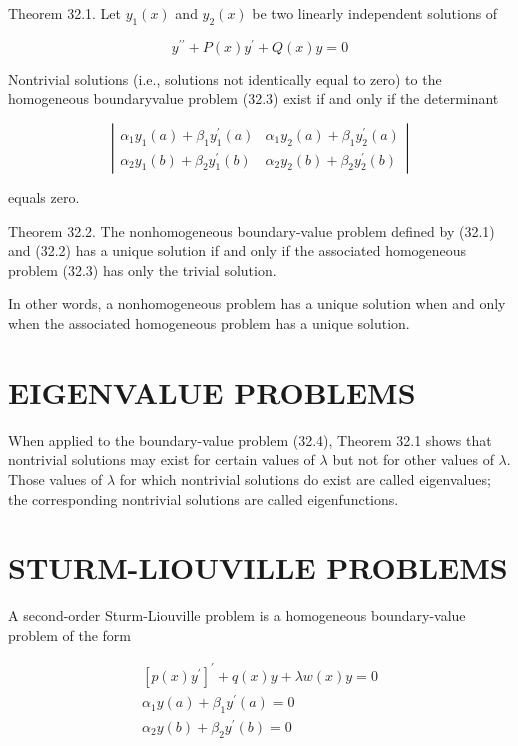 \documentclass[10pt]{article}
\begin{document}
Theorem 32.1. Let $y_{1}(x)$ and $y_{2}(x)$ be two linearly independent solutions of

$$
y^{\prime \prime}+P(x) y^{\prime}+Q(x) y=0
$$

Nontrivial solutions (i.e., solutions not identically equal to zero) to the homogeneous boundaryvalue problem (32.3) exist if and only if the determinant

\[
\left|\begin{array}{ll}
\alpha_{1} y_{1}(a)+\beta_{1} y_{1}^{\prime}(a) & \alpha_{1} y_{2}(a)+\beta_{1} y_{2}^{\prime}(a)  \tag{32.5}\\
\alpha_{2} y_{1}(b)+\beta_{2} y_{1}^{\prime}(b) & \alpha_{2} y_{2}(b)+\beta_{2} y_{2}^{\prime}(b)
\end{array}\right|
\]

equals zero.

Theorem 32.2. The nonhomogeneous boundary-value problem defined by (32.1) and (32.2) has a unique solution if and only if the associated homogeneous problem (32.3) has only the trivial solution.

In other words, a nonhomogeneous problem has a unique solution when and only when the associated homogeneous problem has a unique solution.

\section*{EIGENVALUE PROBLEMS}
When applied to the boundary-value problem (32.4), Theorem 32.1 shows that nontrivial solutions may exist for certain values of $\lambda$ but not for other values of $\lambda$. Those values of $\lambda$ for which nontrivial solutions do exist are called eigenvalues; the corresponding nontrivial solutions are called eigenfunctions.

\section*{STURM-LIOUVILLE PROBLEMS}
A second-order Sturm-Liouville problem is a homogeneous boundary-value problem of the form


\begin{gather*}
{\left[p(x) y^{\prime}\right]^{\prime}+q(x) y+\lambda w(x) y=0}  \tag{32.6}\\
\alpha_{1} y(a)+\beta_{1} y^{\prime}(a)=0 \\
\alpha_{2} y(b)+\beta_{2} y^{\prime}(b)=0 \tag{32.7}
\end{gather*}
\end{document}
